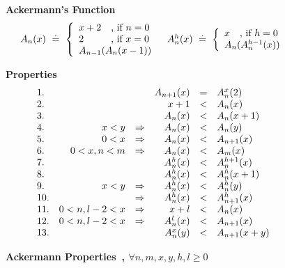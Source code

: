 \begin{figure}[t!]
\textbf{Ackermann's Function}
\[
\begin{array}{lr}
\ack{n}{x} \defeq
 \left\{
\begin{array}{l}
\setlength\arraycolsep{0pt}
\begin{array}{ll}
      x+2 &\quad \text{, if}\ n=0 \\
      2   &\quad \text{, if}\ x=0 \\
\end{array} \\
\ack{n-1}{\ack{n}{x-1}}
\end{array}
\right.
&
\iack{h}{n}{x} \defeq
 \left\{
\begin{array}{l}
      x \quad \text{, if}\ h=0 \\
      \ack{n}{\iack{h-1}{n}{x}}
\end{array}
\right.
\end{array}
 \]

\textbf{Properties}
$$
\begin{array}{lrcrcl}
1.&                &&            A_{n+1}(x)   &=& A^{x}_{n}(2)\\
2.&                &&            x + 1          &<& A_{n}(x)\\
3.&                &&            A_{n}(x)     &<& A_{n}(x+1)\\
4.& x < y          &\Rightarrow& A_{n}(x)     &<& A_{n}(y)\\
5.& 0 < x          &\Rightarrow& A_{n}(x)     &<& A_{n+1}(x)\\
6.& 0 < x, n < m   &\Rightarrow& A_{n}(x)     &<& A_{m}(x)\\
7.&                &&            A^{h}_{n}(x) &<& A^{h+1}_{n}(x)\\
8.&                &&            A^{h}_{n}(x) &<& A^{h}_{n}(x+1)\\
9.& x<y            &\Rightarrow& A^{h}_{n}(x) &<& A^{h}_{n}(y)\\
10.&               &\Rightarrow& A^{h}_{n}(x) &<& A^{h}_{n+1}(x)\\
11.& 0<n, l-2 < x  &\Rightarrow& x + l          &<& A_{n}(x)\\
12.& 0<n, l-2 < x  &\Rightarrow& A^{l}_{n}(x) &<& A_{n+1}(x)\\
13.&               &&            A^{x}_{n}(y) &<& A_{n+1}(x+y)\\
\end{array}
$$
\caption{\textbf{Ackermann Properties~\citep{ackermann},
$\forall n, m, x, y, h, l \geq 0$}}
\label{fig:ackermann}
\end{figure}

